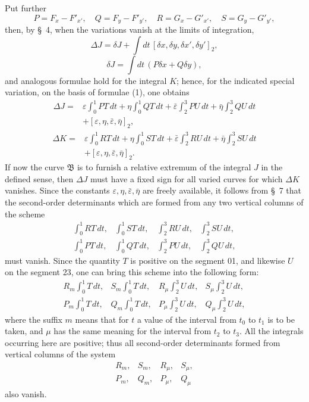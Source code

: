\documentclass[11pt,a4paper,leqno]{article}
\begin{document}
Put further
\[
P=F_x-F'_{x'},\quad Q=F_y-F'_{y'},\quad
R=G_x-G'_{x'},\quad S=G_y-G'_{y'},
\]
then, by \S~4, when the variations vanish at the limits of integration,
\[
\Delta J=\delta J+\int dt\,[\delta x,\delta y,\delta x',\delta y']_2,
\]
\[
\delta J=\int dt\,(P\delta x+Q\delta y),
\]
and analogous formulae hold for the integral $K$; hence, for the indicated special variation, on the basis of formulae (1), one obtains
\[
\begin{aligned}
\Delta J={}&\varepsilon\int_0^1PT\,dt+
\eta\int_0^1QT\,dt+
\bar\varepsilon\int_2^3PU\,dt+
\bar\eta\int_2^3QU\,dt\\
&+[\varepsilon,\eta,\bar\varepsilon,\bar\eta]_2,
\end{aligned}
\]
\[
\begin{aligned}
\Delta K={}&\varepsilon\int_0^1RT\,dt+
\eta\int_0^1ST\,dt+
\bar\varepsilon\int_2^3RU\,dt+
\bar\eta\int_2^3SU\,dt\\
&+[\varepsilon,\eta,\bar\varepsilon,\bar\eta]_2.
\end{aligned}
\]
If now the curve $\mathfrak{B}$ is to furnish a relative extremum of the integral $J$ in the defined sense, then $\Delta J$ must have a fixed sign for all varied curves for which $\Delta K$ vanishes. Since the constants $\varepsilon,\eta,\bar\varepsilon,\bar\eta$ are freely available, it follows from \S~7 that the second-order determinants which are formed from any two vertical columns of the scheme
\[
\begin{array}{cccc}
\displaystyle \int_0^1RT\,dt,&\displaystyle \int_0^1ST\,dt,&\displaystyle \int_2^3RU\,dt,&\displaystyle \int_2^3SU\,dt,\\[2.2ex]
\displaystyle \int_0^1PT\,dt,&\displaystyle \int_0^1QT\,dt,&\displaystyle \int_2^3PU\,dt,&\displaystyle \int_2^3QU\,dt,
\end{array}
\]
must vanish. Since the quantity $T$ is positive on the segment 01, and likewise $U$ on the segment 23, one can bring this scheme into the following form:
\[
\begin{array}{cccc}
\displaystyle R_m\int_0^1T\,dt,&\displaystyle S_m\int_0^1T\,dt,&\displaystyle R_\mu\int_2^3U\,dt,&\displaystyle S_\mu\int_2^3U\,dt,\\[2.2ex]
\displaystyle P_m\int_0^1T\,dt,&\displaystyle Q_m\int_0^1T\,dt,&\displaystyle P_\mu\int_2^3U\,dt,&\displaystyle Q_\mu\int_2^3U\,dt,
\end{array}
\]
where the suffix $m$ means that for $t$ a value of the interval from $t_0$ to $t_1$ is to be taken, and $\mu$ has the same meaning for the interval from $t_2$ to $t_3$. All the integrals occurring here are positive; thus all second-order determinants formed from vertical columns of the system
\begin{equation}\tag{2}
\begin{array}{cccc}
R_m,&S_m,&R_\mu,&S_\mu,\\
P_m,&Q_m,&P_\mu,&Q_\mu
\end{array}
\end{equation}
also vanish.
\end{document}
